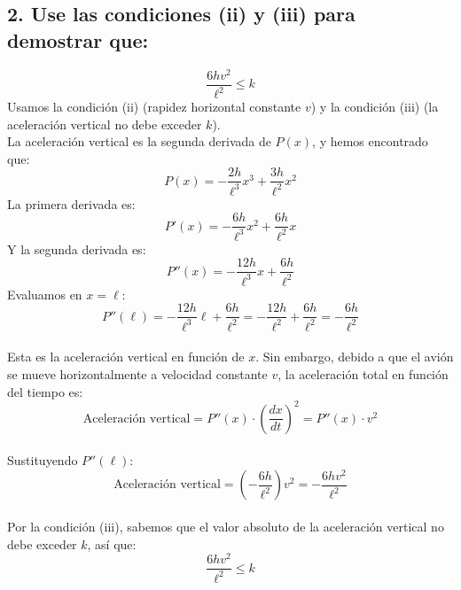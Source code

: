 \documentclass[11pt,letterpaper]{article}
\begin{document}
\subsection*{2. 
Use las condiciones (ii) y (iii) para demostrar que:}
\begin{equation*}
\frac{6hv^2}{\ell^2} \leq k
\end{equation*}
Usamos la condición (ii) (rapidez horizontal constante \( v \)) y la condición (iii) (la aceleración vertical no debe exceder \( k \)).
\\La aceleración vertical es la segunda derivada de \( P(x) \), y hemos encontrado que:
\begin{equation*}
P(x) = -\frac{2h}{\ell^3}x^3 + \frac{3h}{\ell^2}x^2
\end{equation*}
La primera derivada es:
\begin{equation*}
P'(x) = -\frac{6h}{\ell^3}x^2 + \frac{6h}{\ell^2}x
\end{equation*}
Y la segunda derivada es:
\begin{equation*}
P''(x) = -\frac{12h}{\ell^3}x + \frac{6h}{\ell^2}
\end{equation*}
Evaluamos en \( x = \ell \):
\begin{equation*}
P''(\ell) = -\frac{12h}{\ell^3}\ell + \frac{6h}{\ell^2} = -\frac{12h}{\ell^2} + \frac{6h}{\ell^2} = -\frac{6h}{\ell^2}
\end{equation*}
\\Esta es la aceleración vertical en función de \( x \). Sin embargo, debido a que el avión se mueve horizontalmente a velocidad constante \( v \), la aceleración total en función del tiempo es:
\begin{equation*}
\text{Aceleración vertical} = P''(x) \cdot \left( \frac{dx}{dt} \right)^2 = P''(x) \cdot v^2
\end{equation*}
\\Sustituyendo \( P''(\ell) \):
\begin{equation*}
\text{Aceleración vertical} = \left( -\frac{6h}{\ell^2} \right) v^2 = -\frac{6hv^2}{\ell^2}
\end{equation*}
\\Por la condición (iii), sabemos que el valor absoluto de la aceleración vertical no debe exceder \( k \), así que:
\begin{equation*}
\frac{6hv^2}{\ell^2} \leq k
\end{equation*}
\end{document}
